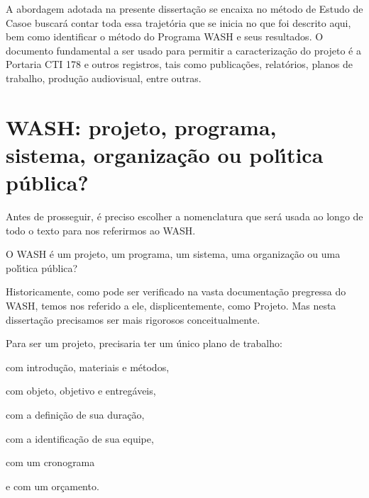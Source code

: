 \documentclass[
12pt,		%
openright,	%
twoside,  %
a4paper,			%
chapter=TITLE,		%
english,			%
french,				%
spanish,			%
brazil				%
]{USPSC-classe/USPSC}
\begin{document}
A abordagem adotada na presente disserta\c{c}\~ao se encaixa no m\'etodo de \textquotedbl Estudo de Caso\textquotedbl  e buscar\'a contar toda essa trajet\'oria que se inicia no que foi descrito aqui, bem como identificar o m\'etodo do Programa WASH e seus resultados. O documento fundamental a ser usado para permitir a caracteriza\c{c}\~ao do projeto \'e a Portaria CTI 178 e outros registros, tais como publica\c{c}\~oes, relat\'orios, planos de trabalho, produ\c{c}\~ao audiovisual, entre outras.









\section[WASH: projeto, programa, sistema, organiza\c{c}\~ao ou pol\'{\i}tica p\'ublica?]{WASH: projeto, programa, sistema, organiza\c{c}\~ao ou pol\'{\i}tica p\'ublica?}\label{WASH: projeto, programa, sistema, organiza\c{c}\~ao ou pol\'{\i}tica p\'ublica?}
Antes de prosseguir, \'e preciso escolher a nomenclatura que ser\'a usada ao longo de todo o texto para nos referirmos ao WASH.









O WASH \'e um projeto, um programa, um sistema, uma organiza\c{c}\~ao ou uma pol\'{\i}tica p\'ublica?









Historicamente, como pode ser verificado na vasta documenta\c{c}\~ao pregressa do WASH, temos nos referido a ele, displicentemente, como Projeto. Mas nesta disserta\c{c}\~ao precisamos ser mais rigorosos conceitualmente.









Para ser um projeto, precisaria ter um \'unico plano de trabalho:










\begin{alineas}
\item com introdu\c{c}\~ao, materiais e m\'etodos,
\item com objeto, objetivo e entreg\'aveis,
\item com a defini\c{c}\~ao de sua dura\c{c}\~ao,
\item com a identifica\c{c}\~ao de sua equipe,
\item com um cronograma
\item e com um or\c{c}amento.
\end{alineas}
\end{document}
